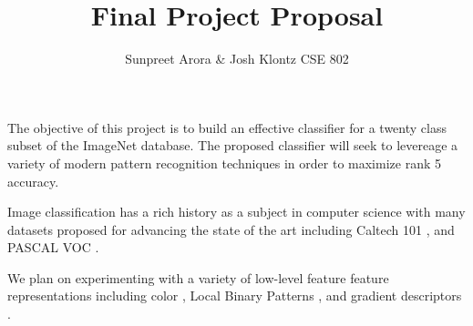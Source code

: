 \documentclass[12pt]{article}
\begin{document}
 
\title{Final Project Proposal}
\author{Sunpreet Arora \& Josh Klontz
CSE 802}
 
\maketitle

The objective of this project is to build an effective classifier for a twenty class subset of the ImageNet \cite{imagenet} database.
The proposed classifier will seek to levereage a variety of modern pattern recognition techniques in order to maximize rank 5 accuracy.

Image classification has a rich history as a subject in computer science with many datasets proposed for advancing the state of the art including Caltech 101 \cite{caltech101}, and PASCAL VOC \cite{pascal09}.

We plan on experimenting with a variety of low-level feature feature representations including color \cite{sande10}, Local Binary Patterns \cite{ahonen06}, and gradient descriptors \cite{lowe04} \cite{dalal05}.



\end{document}
